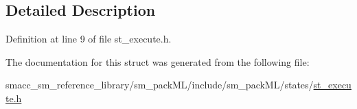 \subsection{Detailed Description}


Definition at line 9 of file st\+\_\+execute.\+h.



The documentation for this struct was generated from the following file\+:\begin{DoxyCompactItemize}
\item 
smacc\+\_\+sm\+\_\+reference\+\_\+library/sm\+\_\+pack\+M\+L/include/sm\+\_\+pack\+M\+L/states/\hyperlink{sm__packML_2include_2sm__packML_2states_2st__execute_8h}{st\+\_\+execute.\+h}\end{DoxyCompactItemize}
